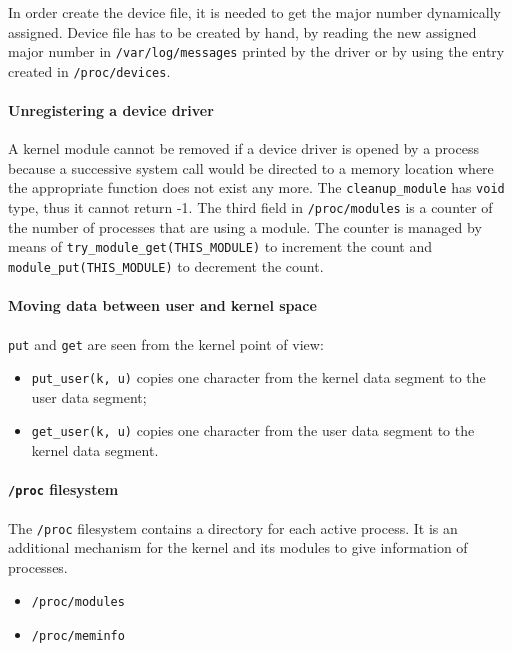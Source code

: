 In order create the device file, it is needed to get the major number dynamically assigned. Device file has to be created by hand, by reading the new assigned major number in \texttt{/var/log/messages} printed by the driver or by using the entry created in \texttt{/proc/devices}.

\paragraph{Unregistering a device driver}
A kernel module cannot be removed if a device driver is opened by a process because a successive system call would be directed to a memory location where the appropriate function does not exist any more. The \texttt{cleanup\_module} has \texttt{void} type, thus it cannot return -1. The third field in \texttt{/proc/modules} is a counter of the number of processes that are using a module. The counter is managed by means of \texttt{try\_module\_get(THIS\_MODULE)} to increment the count and \texttt{module\_put(THIS\_MODULE)} to decrement the count.

\paragraph{Moving data between user and kernel space}
\texttt{put} and \texttt{get} are seen from the kernel point of view:

\begin{itemize}
\item \texttt{put\_user(k, u)} copies one character from the kernel data segment to the user data segment;
\item \texttt{get\_user(k, u)} copies one character from the user data segment to the kernel data segment.
\end{itemize}

\paragraph{\texttt{/proc} filesystem}
The \texttt{/proc} filesystem contains a directory for each active process. It is an additional mechanism for the kernel and its modules to give information of processes. 
\begin{itemize}
\item \texttt{/proc/modules}
\item \texttt{/proc/meminfo}
\end{itemize}
